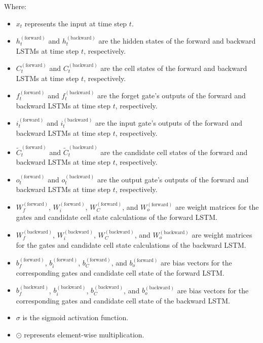 \documentclass[sn-mathphys,Numbered]{sn-jnl}
\theoremstyle{thmstyleone}
\theoremstyle{thmstyletwo}
\theoremstyle{thmstylethree}
\begin{document}
Where:
\begin{itemize}
\item \(x_t\) represents the input at time step \(t\).
\item \(h_t^{(\text{forward})}\) and \(h_t^{(\text{backward})}\) are the hidden states of the forward and backward LSTMs at time step \(t\), respectively.
\item \(C_t^{(\text{forward})}\) and \(C_t^{(\text{backward})}\) are the cell states of the forward and backward LSTMs at time step \(t\), respectively.
\item \(f_t^{(\text{forward})}\) and \(f_t^{(\text{backward})}\) are the forget gate's outputs of the forward and backward LSTMs at time step \(t\), respectively.
\item \(i_t^{(\text{forward})}\) and \(i_t^{(\text{backward})}\) are the input gate's outputs of the forward and backward LSTMs at time step \(t\), respectively.
\item \(\tilde{C}_t^{(\text{forward})}\) and \(\tilde{C}_t^{(\text{backward})}\) are the candidate cell states of the forward and backward LSTMs at time step \(t\), respectively.
\item \(o_t^{(\text{forward})}\) and \(o_t^{(\text{backward})}\) are the output gate's outputs of the forward and backward LSTMs at time step \(t\), respectively.
\item \(W_{f}^{(\text{forward})}\), \(W_{i}^{(\text{forward})}\), \(W_{C}^{(\text{forward})}\), and \(W_{o}^{(\text{forward})}\) are weight matrices for the gates and candidate cell state calculations of the forward LSTM.
\item \(W_{f}^{(\text{backward})}\), \(W_{i}^{(\text{backward})}\), \(W_{C}^{(\text{backward})}\), and \(W_{o}^{(\text{backward})}\) are weight matrices for the gates and candidate cell state calculations of the backward LSTM.
\item \(b_{f}^{(\text{forward})}\), \(b_{i}^{(\text{forward})}\), \(b_{C}^{(\text{forward})}\), and \(b_{o}^{(\text{forward})}\) are bias vectors for the corresponding gates and candidate cell state of the forward LSTM.
\item \(b_{f}^{(\text{backward})}\), \(b_{i}^{(\text{backward})}\), \(b_{C}^{(\text{backward})}\), and \(b_{o}^{(\text{backward})}\) are bias vectors for the corresponding gates and candidate cell state of the backward LSTM.
\item \(\sigma\) is the sigmoid activation function.
\item \(\odot\) represents element-wise multiplication.
\end{itemize}
\end{document}
